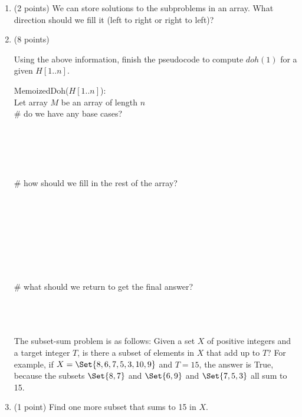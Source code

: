 \documentclass[11pt]{article}
\begin{document}
\begin{enumerate}
\begin{equation*}
\begin{cases}
    \end{cases}
\end{equation*}

    \item (2 points)
    We can store solutions to the subproblems in an array. What direction should we fill it (left to right or right to left)?
    \vspace{1in}

    \item (8 points)

    Using the above information, finish the pseudocode
    to compute $doh(1)$ for a 
    given $H[1..n]$.
    \begin{algo}
    MemoizedDoh($H[1..n]$):\+\\
    Let array $M$ be an array of length $n$\\
    \# do we have any base cases?\\
    \\
    \\
    \\
    \\
    \\
    \# how should we fill in the rest of the array?\\
    \\
    \\
    \\
    \\
    \\
    \\
    \\
    \\
    \# what should we return to get the final answer?\\
    \\
    \\
    \\
    \hspace{5in}
    \end{algo}

    \newpage
    The subset-sum problem is as follows:
    Given a set $X$ of positive integers and a target integer $T$, is there
    a subset of elements in $X$ that add up to $T$? For example, if $X=\Set{8, 6, 7, 5, 3, 10, 9}$
    and $T=15$, the answer is True, because the subsets $\Set{8,7}$ and $\Set{6,9}$ and $\Set{7, 5, 3}$
    all sum to 15.


    \item (1 point) 
    Find one more subset that sums to 15 in $X$.
    \vspace{1in}


\end{enumerate}
\end{document}
